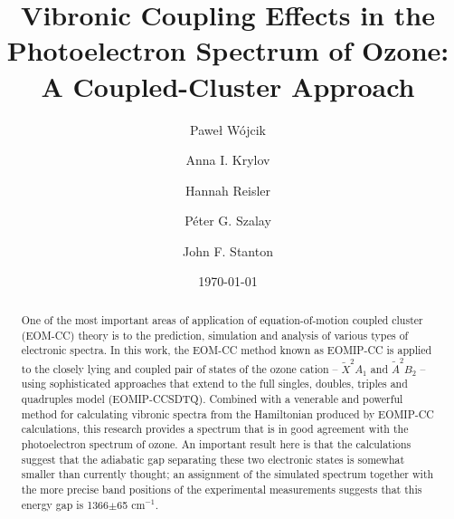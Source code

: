 \documentclass[12pt,a4paper,prb,aps,superscriptaddress]{revtex4}
\begin{document}
\title{Vibronic Coupling Effects in the Photoelectron Spectrum of Ozone: A
Coupled-Cluster Approach}

\author{Pawe{\l} W{\'o}jcik}

\author{Anna I. Krylov}

\author{Hannah Reisler}

\author{P{\'e}ter G. Szalay}

\author{John F. Stanton}

\date{\today}

\begin{abstract}
One of the most important areas of application of equation-of-motion coupled
cluster (EOM-CC) theory is to the prediction, simulation and analysis of
various types of electronic spectra.   In this work, the EOM-CC method known
as EOMIP-CC is applied to the closely lying and coupled pair of states of the
ozone cation -- ${\tilde X}^2A_1$ and ${\tilde A}^2B_2$ -- using sophisticated
approaches that extend to the full singles, doubles, triples and quadruples
model (EOMIP-CCSDTQ).   Combined with a venerable and powerful method for
calculating vibronic spectra from the Hamiltonian produced by EOMIP-CC
calculations, this research provides a spectrum that is in good agreement with
the photoelectron spectrum of ozone.   An important result here is that the
calculations suggest that the adiabatic gap separating these two electronic
states is somewhat smaller than currently thought; an assignment of the
simulated spectrum together with the more precise band positions of the
experimental measurements suggests that this energy gap is 1366$\pm$65
cm$^{-1}$.
\end{abstract}
\end{document}
